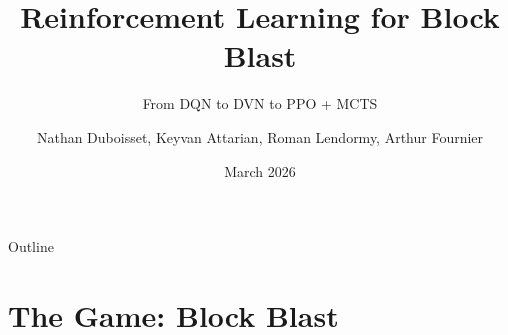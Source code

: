 \documentclass[aspectratio=169,10pt]{beamer}
\title[\textbf{RL for Block Blast}]{\textbf{Reinforcement Learning for Block Blast}}
\subtitle{From DQN to DVN to PPO + MCTS}
\author{Nathan Duboisset, Keyvan Attarian, Roman Lendormy, Arthur Fournier}
\date{March 2026}
\begin{document}
\begin{frame}
\titlepage
\end{frame}

\begin{frame}{Outline}
\tableofcontents
\end{frame}

\section{The Game: Block Blast}

\end{document}
